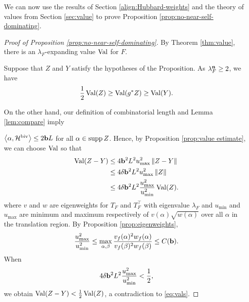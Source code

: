 We can now use the results of Section \ref{align:Hubbard-weights} and the theory of values from Section \ref{sec:value} to prove Proposition \ref{prop:no-near-self-dominating}.
\begin{proof}[Proof of Proposition \ref{prop:no-near-self-dominating}]

By Theorem \ref{thm:value}, there is an $\lambda_F$-expanding value $\operatorname{Val}$ for $F$.

Suppose that $Z$ and $Y$ satisfy the hypotheses of the Proposition.
As $\lambda_F^{\mathbf{n}} \ge 2$, we have
\begin{equation} \label{eq:vals}
\frac12 \operatorname{Val}(Z) \ge \operatorname{Val}(g^*Z)\ge \operatorname{Val}(Y).
\end{equation}


On the other hand,
our definition of combinatorial length and Lemma \ref{lem:compare} imply

$\left< \alpha, \mathcal H^{\mathrm{biv}} \right>
 \leq 2 \mathbf b L$ 
for all $\alpha \in \operatorname{supp} Z$. 
Hence,  by Proposition \ref{prop:value estimate}, we can choose $\operatorname{Val}$ so that
\begin{align*}
\operatorname{Val}(Z - Y) 
&\le 4 \mathbf b^2 L^2 u_{\max}^2 \left\Vert Z - Y \right\Vert \\
&\le 4 \delta  \mathbf b^2 L^2  u_{\max}^2 \left\Vert Z \right\Vert \\
& \le 4\delta  \mathbf b^2 L^2 \frac{u_{\max}^2}{u_{\min}^2} \operatorname{Val}(Z).
\end{align*}
where  $v$ and $w$ are eigenweights for $T_F$ and $T_F^\top$ with eigenvalue $\lambda_F$ and $u_{\min}$ and $u_{\max}$ are minimum and maximum respectively of $v(\alpha)\sqrt{w(\alpha)}$ over all $\alpha$ in the translation region.
By Proposition \ref{prop:eigenweights},
\begin{equation}
 \frac{u_{\max}^2}{u_{\min}^2} \le \max_{\alpha, \beta} \frac{v_f(\alpha)^2 w_f(\alpha)}{v_f(\beta)^2 w_f(\beta)} \le C(\mathbf b).
\end{equation}
When
\begin{equation} \label{eq:delta-control}
4 \delta \mathbf b^2 L^2 \frac{u_{\max}^2}{u_{\min}^2} < \frac12, 
\end{equation}
we obtain $\operatorname{Val}(Z - Y) < \frac12 \operatorname{Val}(Z)$, a contradiction to \eqref{eq:vals}.
\end{proof}


